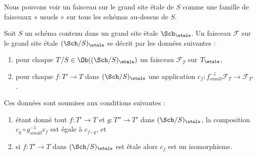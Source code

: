 \noindent
Nous pouvons voir un faisceau sur le grand site étale de $S$ comme une famille de faisceaux « usuels » sur tous les schémas au-dessus de $S$.

\begin{lemma}
\label{lemma-characterize-sheaf-big-etale}
Soit $S$ un schéma contenu dans un grand site étale $\Sch_\etale$. Un faisceau $\mathcal{F}$ sur le grand site étale $(\Sch/S)_\etale$ se décrit par les données suivantes :
\begin{enumerate}
\item pour chaque $T/S \in \Ob((\Sch/S)_\etale)$ un faisceau $\mathcal{F}_T$ sur $T_\etale$,
\item pour chaque $f : T' \to T$ dans $(\Sch/S)_\etale$ une application $c_f : f_{small}^{-1}\mathcal{F}_T \to \mathcal{F}_{T'}$.
\end{enumerate}
Ces données sont soumises aux conditions suivantes :
\begin{enumerate}
\item[(a)] étant donné tout $f : T' \to T$ et $g : T'' \to T'$ dans $(\Sch/S)_\etale$, la composition $c_g \circ g_{small}^{-1}c_f$ est égale à $c_{f \circ g}$, et
\item[(b)] si $f : T' \to T$ dans $(\Sch/S)_\etale$ est étale alors $c_f$ est un isomorphisme.
\end{enumerate}
\end{lemma}


